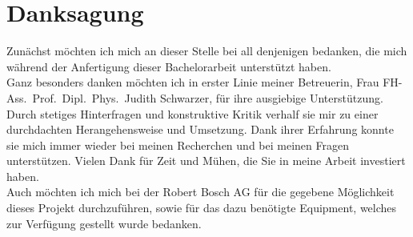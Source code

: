 \chapter*{Danksagung}
\thispagestyle{plain}
\pagestyle{plain}

Zunächst möchten ich mich an dieser Stelle bei all denjenigen bedanken, die mich während der Anfertigung dieser Bachelorarbeit unterstützt haben.\\

Ganz besonders danken möchten ich in erster Linie meiner Betreuerin, Frau FH-Ass.~Prof.~Dipl.~Phys.~Judith Schwarzer, für ihre ausgiebige Unterstützung. Durch stetiges Hinterfragen und konstruktive Kritik verhalf sie mir zu einer durchdachten Herangehensweise und Umsetzung. Dank ihrer Erfahrung konnte sie mich immer wieder bei meinen Recherchen und bei meinen Fragen unterstützen. Vielen Dank für Zeit und Mühen, die Sie in meine Arbeit investiert haben.\\

Auch möchten ich mich bei der Robert Bosch AG für die gegebene Möglichkeit dieses Projekt durchzuführen, sowie für das dazu benötigte Equipment, welches zur Verfügung gestellt wurde bedanken.\\ 


\newpage
